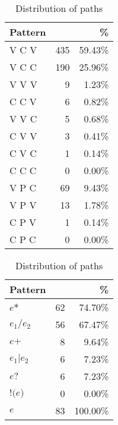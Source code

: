 \documentclass[runningheads]{llncs}
\newcommand{\ntextnumero}{{\fontfamily{txr}\selectfont \textnumero}\xspace}
\begin{document}
\begin{table}[t]
	\begin{minipage}[b]{0.47\linewidth}
		\centering
		\caption{Distribution of triple patterns (C: Constant, V: Variable, P: Path). \label{tab:Pattern}}
		\begin{tabular}{lrr}    \toprule
			\textbf{Pattern} & \textbf{\ntextnumero} & \textbf{\%} \\    \midrule
			V C V   & 435      & 59.43\%    \\
			V C C   & 190      & 25.96\%    \\
			V V V   & 9        & 1.23\%     \\
			C C V   & 6        & 0.82\%     \\
			V V C   & 5        & 0.68\%     \\
			C V V   & 3        & 0.41\%     \\
			C V C   & 1        & 0.14\%     \\
			C C C   & 0        & 0.00\%     \\    \midrule
			V P C   & 69       & 9.43\%     \\
			V P V   & 13       & 1.78\%     \\
			C P V   & 1        & 0.14\%     \\
			C P C   & 0        & 0.00\%     \\    \bottomrule
		\end{tabular}
	\end{minipage}
	\hfill
	\begin{minipage}[b]{0.47\linewidth}
		\centering
		\caption{Distribution of paths\label{tab:Path}}
		\begin{tabular}{lrr}    \toprule
			\textbf{Pattern}      & \textbf{\ntextnumero} & \textbf{\%} \\    \midrule
			$e\texttt{*}$   & 62       & 74.70\%     \\
			$e_1 \texttt{/} e_2$  & 56       & 67.47\%    \\
			$e\texttt{+} $   & 8        & 9.64\%     \\
			$e_1 \texttt{|} e_2$  & 6        & 7.23\%     \\
			$e\texttt{?}$    & 6        & 7.23\%     \\
			$\texttt{!(}e\texttt{)}$ & 0        & 0.00\%        \\ \midrule
			$e$ & 83 & 100.00\% \\
			\bottomrule
		\end{tabular}
	\end{minipage}
\end{table}
\end{document}
